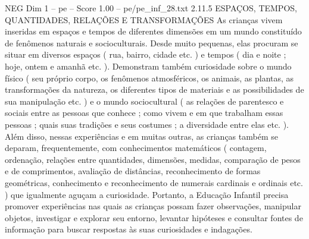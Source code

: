 \begin{textsample}{NEG Dim 1 – pe – Score 1.00 – pe/pe\_inf\_28.txt}  \label{ex:f1_neg_041}
2.11.5 ESPAÇOS, TEMPOS, QUANTIDADES, RELAÇÕES E TRANSFORMAÇÕES As crianças vivem inseridas em espaços e tempos de diferentes dimensões em um mundo constituído de fenômenos naturais e socioculturais.
Desde muito pequenas, elas procuram se situar em diversos espaços ( rua, bairro, cidade etc. ) e tempos ( dia e noite ; hoje, ontem e amanhã etc. ).
Demonstram também curiosidade sobre o mundo físico ( seu próprio corpo, os fenômenos atmosféricos, os animais, as plantas, as transformações da natureza, os diferentes tipos de materiais e as possibilidades de sua manipulação etc. ) e o mundo sociocultural ( as relações de parentesco e sociais entre as pessoas que conhece ; como vivem e em que trabalham essas pessoas ; quais suas tradições e seus costumes ; a diversidade entre elas etc. ).
Além disso, nessas experiências e em muitas outras, as crianças também se deparam, frequentemente, com conhecimentos matemáticos ( contagem, ordenação, relações entre quantidades, dimensões, medidas, comparação de pesos e de comprimentos, avaliação de distâncias, reconhecimento de formas geométricas, conhecimento e reconhecimento de numerais cardinais e ordinais etc. ) que igualmente aguçam a curiosidade.
Portanto, a Educação Infantil precisa promover experiências nas quais as crianças possam fazer observações, manipular objetos, investigar e explorar seu entorno, levantar hipóteses e consultar fontes de informação para buscar respostas às suas curiosidades e indagações.

\end{textsample}
